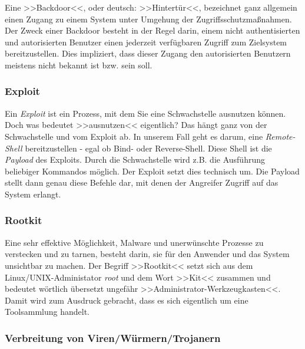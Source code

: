 Eine >>Backdoor<<, oder deutsch: >>Hintertür<<, bezeichnet ganz allgemein einen Zugang zu einem System unter Umgehung der Zugriffsschutzmaßnahmen. Der Zweck einer Backdoor besteht in der Regel darin, einem nicht authentisierten und autorisierten Benutzer einen jederzeit verfügbaren Zugriff zum Zielsystem bereitzustellen. Dies impliziert, dass dieser Zugang den autorisierten Benutzern meistens nicht bekannt ist bzw. sein soll.


\subsubsection{Exploit}
\label{sec:Exploit}

Ein \textit{Exploit} ist ein Prozess, mit dem Sie eine Schwachstelle ausnutzen können. Doch was bedeutet >>ausnutzen<< eigentlich? Das hängt ganz von der Schwachstelle und vom Exploit ab. In unserem Fall geht es darum, eine \textit{Remote-Shell} bereitzustellen - egal ob Bind- oder Reverse-Shell. Diese Shell ist die \textit{Payload} des Exploits. Durch die Schwachstelle wird z.B. die Ausführung beliebiger Kommandos möglich. Der Exploit setzt dies technisch um. Die Payload stellt dann genau diese Befehle dar, mit denen der Angreifer Zugriff auf das System erlangt.

\subsubsection{Rootkit}
\label{sec:Rootkit}

Eine sehr effektive Möglichkeit, Malware und unerwünschte Prozesse zu verstecken und zu tarnen, besteht darin, sie für den Anwender und das System unsichtbar zu machen. Der Begriff >>Rootkit<< setzt sich aus dem Linux/UNIX-Administator \textit{root} und dem Wort >>Kit<< zusammen und bedeutet wörtlich übersetzt ungefähr >>Administrator-Werkzeugkasten<<. Damit wird zum Ausdruck gebracht, dass es sich eigentlich um eine Toolsammlung handelt.

\subsubsection{Verbreitung von Viren/Würmern/Trojanern}
\label{sec:VerbreitungVirenWuermerTrojaner}

